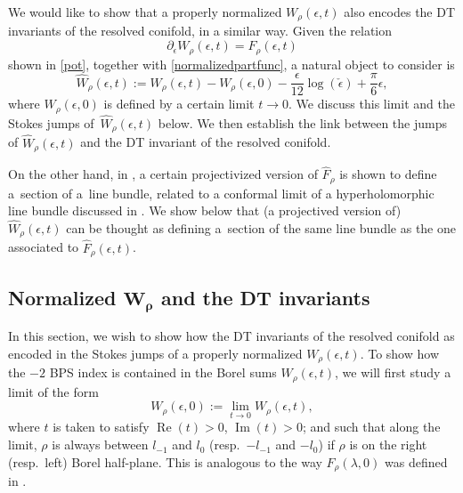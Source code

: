 \documentclass[pdftex]{sigma}
\numberwithin{equation}{section}
\begin{document}
We would like to show that a properly normalized $W_{\rho}(\epsilon,t)$ also encodes the DT invariants of the resolved conifold, in a similar way. Given the relation
\begin{equation*}
 \partial_{\epsilon}W_{\rho}(\epsilon,t)=F_{\rho}(\epsilon,t)
\end{equation*}
shown in \eqref{pot}, together with \eqref{normalizedpartfunc},
a natural object to consider is
\begin{equation}\label{normalizedW}
 \widehat{W}_{\rho}(\epsilon,t):=W_{\rho}(\epsilon,t)-W_{\rho}(\epsilon,0) -\frac{\epsilon}{12}\log(\check\epsilon)+\frac{\pi}{6}\epsilon,
\end{equation}
where $W_{\rho}(\epsilon,0)$ is defined by a certain limit $t\to 0$. We discuss this limit and the Stokes jumps of~$\hat{W}_{\rho}(\epsilon,t)$ below. We then establish the link between the jumps of $\hat{W}_{\rho}(\epsilon,t)$ and the DT invariant of the resolved conifold.

On the other hand, in \cite[Section 4]{ASTT21}, a certain projectivized version of $\hat{F}_{\rho}$ is shown to define a~section of a~line bundle, related to a conformal limit of a hyperholomorphic line bundle discussed in \cite{APP, Neitzke_hyperhol}. We show below that (a projectived version of)~$\hat{W}_{\rho}(\epsilon,t)$ can be thought as defining a~section of the same line bundle as the one associated to $\hat{F}_{\rho}(\epsilon,t)$.

\subsection[Normalized $W_{\rho}$ and the DT invariants]{Normalized $\boldsymbol{W_{\rho}}$ and the DT invariants}\label{sec:normalizedW}

In this section, we wish to show how the DT invariants of the resolved conifold as encoded in the Stokes jumps of a properly normalized $W_{\rho}(\epsilon,t)$. To show how the $-2$ BPS index is contained in the Borel sums $W_{\rho}(\epsilon,t)$, we will first study a limit of the form
\begin{equation*}
 W_{\rho}(\epsilon,0):= \lim_{t\to 0}W_{\rho}(\epsilon,t),
\end{equation*}
where $t$ is taken to satisfy $\operatorname{Re}(t)>0$, $\operatorname{Im}(t)>0$; and such that along the limit, $\rho$ is always between $l_{-1}$ and $l_0$ (resp.\ $-l_{-1}$ and $-l_0$) if $\rho$ is on the right (resp.\ left) Borel half-plane. This is analogous to the way $F_{\rho}(\lambda,0)$ was defined in \cite{ASTT21}.
\end{document}
